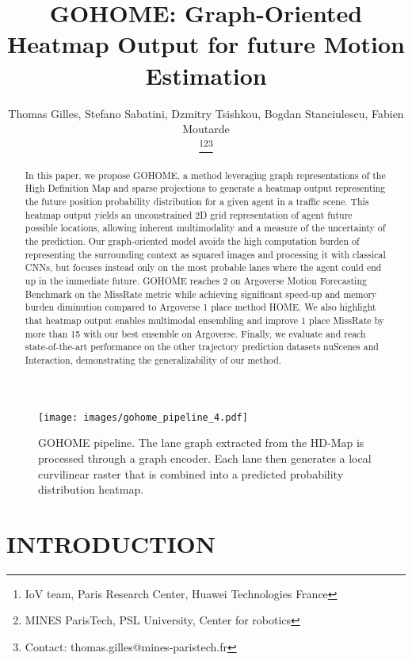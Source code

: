 \documentclass[letterpaper, 10 pt, conference]{ieeeconf}
\title{\LARGE \bf
GOHOME: Graph-Oriented Heatmap Output for future Motion Estimation
}
\author{Thomas Gilles, Stefano Sabatini, Dzmitry Tsishkou, Bogdan Stanciulescu, Fabien Moutarde

\thanks{IoV team, Paris Research Center, Huawei Technologies France}\thanks{MINES ParisTech, PSL University, Center for robotics}\thanks{Contact: thomas.gilles@mines-paristech.fr}}
\begin{document}
\maketitle
\thispagestyle{empty}
\pagestyle{empty}



\begin{abstract}

    In this paper, we propose GOHOME, a method leveraging graph representations of the High Definition Map and sparse projections to generate a heatmap output representing the future position probability distribution for a given agent in a traffic scene. This heatmap output yields an unconstrained 2D grid representation of agent future possible locations, allowing inherent multimodality and a measure of the uncertainty of the prediction. Our graph-oriented model avoids the high computation burden of representing the surrounding context as squared images and processing it with classical CNNs, but focuses instead only on the most probable lanes where the agent could end up in the immediate future. GOHOME reaches 2 on Argoverse Motion Forecasting Benchmark on the MissRate metric while achieving significant speed-up and memory burden diminution compared to Argoverse 1 place method HOME. We also highlight that heatmap output enables multimodal ensembling and improve 1 place MissRate by more than 15 with our best ensemble on Argoverse. Finally, we evaluate and reach state-of-the-art performance on the other trajectory prediction datasets nuScenes and Interaction, demonstrating the generalizability of our method.


\end{abstract}

\begin{figure*}[b]
\centerline{\texttt{[image: images/gohome\_pipeline\_4.pdf]}}
\caption{GOHOME pipeline. The lane graph extracted from the HD-Map is processed through a graph encoder. Each lane then generates a local curvilinear raster that is combined into a predicted probability distribution heatmap. }
\label{fig:gohome_pipeline}
\end{figure*}



\section{INTRODUCTION}
\end{document}
